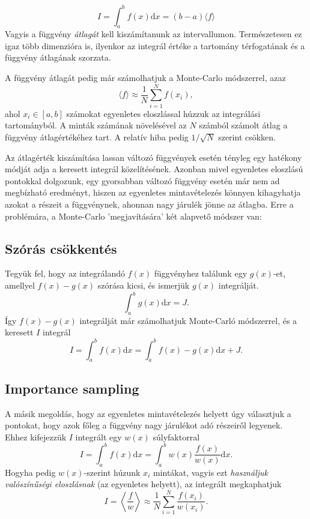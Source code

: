 \documentclass[12pt]{article}
\theoremstyle{plain}
\begin{document}
\begin{equation}
    I = \int_a ^b f(x) \text{d}x = (b-a)\langle f \rangle
\end{equation}
Vagyis a függvény {\em átlagát} kell kiszámítanunk az intervallumon. Természetesen ez igaz több dimenzióra is, ilyenkor az integrál értéke a tartomány térfogatának és a függvény átlagának szorzata. 

A függvény átlagát pedig már számolhatjuk a Monte-Carlo módszerrel, azaz 
\begin{equation}
    \langle f \rangle  \approx \frac{1}{N}\sum_{i=1}^N f(x_i), 
\end{equation}
ahol $x_i \in [a, b]$ számokat egyenletes eloszlással húzzuk az integrálási tartományból. A minták számának növelésével az $N$ számból számolt átlag a függvény átlagértékéhez tart. A relatív hiba pedig $1/\sqrt{N}$ szerint csökken.  

Az átlagérték kiszámítása lassan változó függvények esetén tényleg egy hatékony módját adja a keresett integrál közelítésének. Azonban mivel egyenletes eloszlású pontokkal dolgozunk, egy gyorsabban változó függvény esetén már nem ad megbízható eredményt, hiszen az egyenletes mintavételezés könnyen kihagyhatja azokat a részeit a függvénynek, ahonnan nagy járulék jönne az átlagba. Erre a problémára, a Monte-Carlo 'megjavítására' két alapvető módszer van:
\subsection{Szórás csökkentés}
Tegyük fel, hogy az integrálandó $f(x)$ függvényhez találunk egy $g(x)$-et, amellyel $f(x)-g(x)$ szórása kicsi, és ismerjük $g(x)$ integrálját.
$$
\int_a ^b g(x) \text{d} x = J.
$$
Így $f(x)-g(x)$ integrálját már számolhatjuk Monte-Carló módszerrel, és a keresett $I$ integrál
$$
I = \int_a ^b f(x) \text{d}x = \int_a ^b f(x)-g(x) \text{d}x + J. 
$$
\subsection{Importance sampling}
A másik megoldás, hogy az egyenletes mintavételezés helyett úgy választjuk a pontokat, hogy azok főleg a függvény nagy járulékot adó részeiről legyenek. Ehhez kifejezzük $I$ integrált egy $w(x)$ súlyfaktorral
\begin{equation}
    I = \int_a ^b f(x) \text{d}x = \int_a ^b w(x)\frac{f(x)}{w(x)}\text{d}x.
\end{equation}
Hogyha pedig $w(x)$-szerint húzunk $x_i$ mintákat, vagyis ezt {\em használjuk valószínűségi eloszlásnak} (az egyenletes helyett), az integrált megkaphatjuk
$$
I = \left \langle \frac{f}{w} \right \rangle \approx \frac{1}{N} \sum_{i=1}^N \frac{f(x_i)}{w(x_i)}. 
$$
\end{document}
